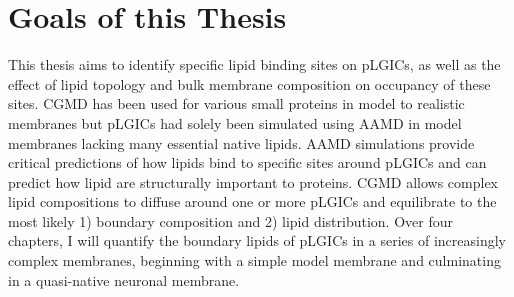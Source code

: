 \documentclass[12pt]{ruthesis_nofloat}
\newcommand{\lo}{l_{\mathrm{o}}}
\newcommand{\ldo}{l_{\mathrm{do}}}
\newcommand{\nachr}{nAChR}
\newcommand{\plgic}{pLGIC}
\begin{document}
\section{Goals of this Thesis}

This thesis aims to identify specific lipid binding sites on pLGICs, as well as the effect of lipid topology and bulk membrane composition on occupancy of these sites. CGMD has been used for various small proteins in model to realistic membranes \citep{Hung2011,Domanski2012,Parton2013,Flinner2015,Lin2018} but \plgic s had solely been simulated using AAMD in model membranes lacking many essential native lipids. AAMD simulations provide critical predictions of how lipids bind to specific sites around \plgic s and can predict how lipid are structurally important to proteins. CGMD allows complex lipid compositions to diffuse around one or more \plgic s and equilibrate to the most likely 1) boundary composition and 2) lipid distribution. Over four chapters, I will quantify the boundary lipids of pLGICs in a series of increasingly complex membranes, beginning with a simple model membrane and culminating in a quasi-native neuronal membrane.   

%
\end{document}
